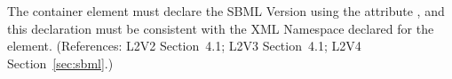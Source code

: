 The  container element must declare the SBML Version
using the attribute , and this declaration must be
consistent with the XML Namespace declared for the 
element.  (References: L2V2 Section~4.1; L2V3 Section~4.1; L2V4 Section~\ref{sec:sbml}.)
